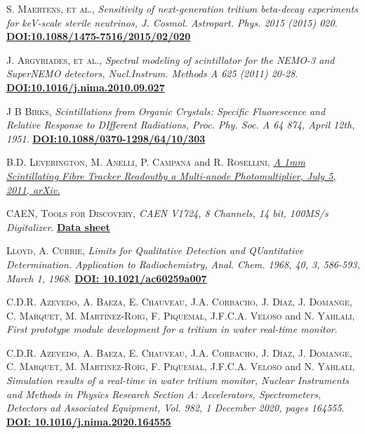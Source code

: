 \begin{thebibliography}{100}
 \textsc{S. Maertens}, \textsc{et al.},  \textit{Sensitivity of next-generation tritium beta-decay experiments for keV-scale sterile neutrinos, J. Cosmol. Astropart. Phys. 2015 (2015) 020}. \href{https://iopscience.iop.org/article/10.1088/1475-7516/2015/02/020}\textbf{DOI:10.1088/1475-7516/2015/02/020}

 \textsc{J. Argyriades}, \textsc{et al.},
\textit{Spectral modeling of scintillator for the NEMO-3 and SuperNEMO detectors, Nucl.Instrum. Methods A 625 (2011) 20-28}. \href{https://doi.org/10.1016/j.nima.2010.09.027}{\textbf{DOI:10.1016/j.nima.2010.09.027}}

 \textsc{J B Birks},
\textit{Scintillations from Organic Crystals: Specific Fluorescence and Relative Response to DIfferent Radiations, Proc. Phy. Soc. A 64 874, April 12th, 1951}. \href{https://doi.org/10.1088/0370-1298/64/10/303}{\textbf{DOI:10.1088/0370-1298/64/10/303}}

 \textsc{B.D. Leverington}, \textsc{M. Anelli}, \textsc{P. Campana} and \textsc{R. Rosellini},
\href{https://arxiv.org/abs/1106.5649}{\textit{A 1mm Scintillating Fibre Tracker Readoutby a Multi-anode Photomultiplier, July 5, 2011, arXiv.}}

 \textsc{CAEN, Tools for Discovery},
\textit{CAEN V1724, 8 Channels, 14 bit, 100MS/s Digitalizer}. \href{https://www.caen.it/products/v1724/}{\textbf{Data sheet}}

 \textsc{Lloyd, A. Currie},
\textit{Limits for Qualitative Detection and QUantitative Determination. Application to Radiochemistry, Anal. Chem. 1968, 40, 3, 586-593, March 1, 1968}. \href{https://doi.org/10.1021/ac60259a007}{\textbf{DOI: 10.1021/ac60259a007}}

 \textsc{C.D.R. Azevedo}, \textsc{A. Baeza}, \textsc{E. Chauveau}, \textsc{J.A. Corbacho}, \textsc{J. Díaz}, \textsc{J. Domange}, \textsc{C. Marquet}, \textsc{M. Martinez-Roig}, \textsc{F. Piquemal}, \textsc{J.F.C.A. Veloso} and \textsc{N. Yahlali},
\textit{First prototype module development for a tritium in water real-time monitor}. %

 \textsc{C.D.R. Azevedo}, \textsc{A. Baeza}, \textsc{E. Chauveau}, \textsc{J.A. Corbacho}, \textsc{J. Díaz}, \textsc{J. Domange}, \textsc{C. Marquet}, \textsc{M. Martinez-Roig}, \textsc{F. Piquemal}, \textsc{J.F.C.A. Veloso} and \textsc{N. Yahlali},
\textit{Simulation results of a real-time in water tritium monitor, Nuclear Instruments and Methods in Physics Research Section A: Accelerators, Spectrometers, Detectors ad Associated Equipment, Vol. 982, 1 December 2020, pages 164555}. \href{https://doi.org/10.1016/j.nima.2020.164555}{\textbf{DOI: 10.1016/j.nima.2020.164555 }}


\end{thebibliography}